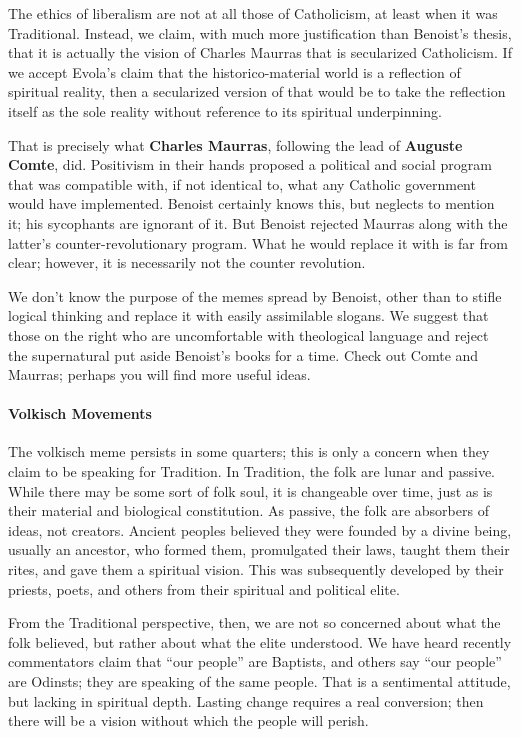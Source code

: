 The ethics of liberalism are not at all those of Catholicism, at least when it was Traditional. Instead, we claim, with much more justification than Benoist's thesis, that it is actually the vision of Charles Maurras that is secularized Catholicism. If we accept Evola's claim that the historico-material world is a reflection of spiritual reality, then a secularized version of that would be to take the reflection itself as the sole reality without reference to its spiritual underpinning.

That is precisely what \textbf{Charles Maurras}, following the lead of \textbf{Auguste Comte}, did. Positivism in their hands proposed a political and social program that was compatible with, if not identical to, what any Catholic government would have implemented. Benoist certainly knows this, but neglects to mention it; his sycophants are ignorant of it. But Benoist rejected Maurras along with the latter's counter-revolutionary program. What he would replace it with is far from clear; however, it is necessarily not the counter revolution.

We don't know the purpose of the memes spread by Benoist, other than to stifle logical thinking and replace it with easily assimilable slogans. We suggest that those on the right who are uncomfortable with theological language and reject the supernatural put aside Benoist's books for a time. Check out Comte and Maurras; perhaps you will find more useful ideas.

\paragraph{Volkisch Movements}


The volkisch meme persists in some quarters; this is only a concern when they claim to be speaking for Tradition. In Tradition, the folk are lunar and passive. While there may be some sort of folk soul, it is changeable over time, just as is their material and biological constitution. As passive, the folk are absorbers of ideas, not creators. Ancient peoples believed they were founded by a divine being, usually an ancestor, who formed them, promulgated their laws, taught them their rites, and gave them a spiritual vision. This was subsequently developed by their priests, poets, and others from their spiritual and political elite.

From the Traditional perspective, then, we are not so concerned about what the folk believed, but rather about what the elite understood. We have heard recently commentators claim that ``our people'' are Baptists, and others say ``our people'' are Odinsts; they are speaking of the same people. That is a sentimental attitude, but lacking in spiritual depth. Lasting change requires a real conversion; then there will be a vision without which the people will perish.


